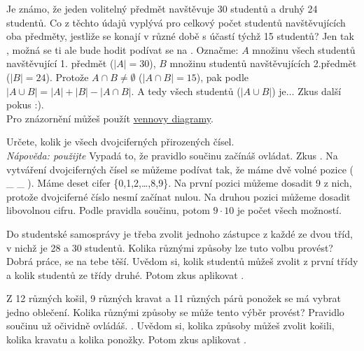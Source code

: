 \documentclass[language = czech]{webquiz}
\begin{document}
	\begin{question} \label{o3} %
		Je známo, že jeden volitelný předmět navštěvuje 30 studentů a druhý 24 studentů. Co z těchto údajů vyplývá pro celkový počet studentů navštěvujících oba předměty, jestliže se konají v různé době s účastí týchž 15 studentů?
		\whenRight Jen tak , možná se ti ale bude hodit podívat se na .
		\whenWrong Označme: $A$ množinu všech studentů navštěvující 1. předmět ($|A|=30$), $B$ množinu studentů navštěvujících 2.předmět ($|B|=24$). Protože $A\cap B \neq \emptyset$ ($|A\cap B| = 15$), pak podle $|A\cup B| = |A| + |B| - |A\cap B|$. A tedy všech studentů ($|A\cup B|$) je$\dots$ Zkus další pokus :).\\ Pro znázornění můžeš použít \href{https://www.youtube.com/watch?v=5c_m2EA0sN8}{vennovy diagramy}.
	\end{question}
	
	\begin{question} \label{o4} %
		Určete, kolik je všech dvojciferných přirozených čísel.\\ \textit{Nápověda: použijte} 
		\whenRight Vypadá to, že pravidlo součinu začínáš ovládat. Zkus .
		\whenWrong Na vytváření dvojciferných čísel se můžeme podívat tak, že máme dvě volné pozice ( \_ \_ ). Máme deset cifer \{0,1,2,\dots ,8,9\}. Na první pozici můžeme dosadit 9 z nich, protože dvojciferné číslo nesmí začínat nulou. Na druhou pozici můžeme dosadit libovolnou cifru. Podle pravidla součinu, potom $9\cdot 10$ je počet všech možností.
	\end{question}
	
	\begin{question} \label{o5} %
		Do studentské samosprávy je třeba zvolit jednoho zástupce z každé ze dvou tříd, v nichž je 28 a 30 studentů. Kolika různými způsoby lze tuto volbu provést?
		\whenRight Dobrá práce,  se na tebe těší.
		\whenWrong Uvědom si, kolik studentů můžeš zvolit z první třídy a kolik studentů ze třídy druhé. Potom zkus aplikovat .
	\end{question}
	
	\begin{question} \label{o6} %
		Z 12 různých košil, 9 různých kravat a 11 různých párů ponožek se má vybrat jedno oblečení. Kolika různými způsoby se může tento výběr provést?
		\whenRight Pravidlo součinu už očividně ovládáš. .
		\whenWrong Uvědom si, kolika způsoby můžeš zvolit košili, kolika kravatu a kolika ponožky. Potom zkus aplikovat .
	\end{question}
	
\end{document}
